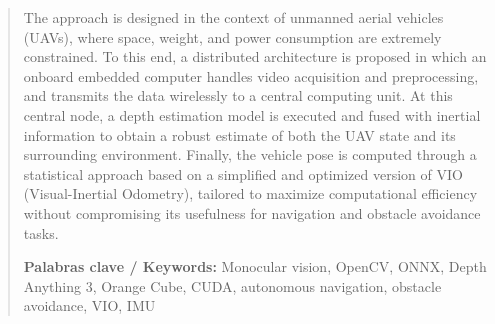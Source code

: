 \begin{abstract}
	The approach is designed in the context of unmanned aerial vehicles (UAVs), where space, weight, and power consumption are extremely 
	constrained. To this end, a distributed architecture is proposed in which an onboard embedded computer handles video acquisition and 
	preprocessing, and transmits the data wirelessly to a central computing unit. At this central node, a depth estimation model is 
	executed and fused with inertial information to obtain a robust estimate of both the UAV state and its surrounding environment. 
	Finally, the vehicle pose is computed through a statistical approach based on a simplified and optimized version of VIO 
	(Visual-Inertial Odometry), tailored to maximize computational efficiency without compromising its 
	usefulness for navigation and obstacle avoidance tasks.

	\textbf{Palabras clave / Keywords:}
	Monocular vision, OpenCV, ONNX, Depth Anything 3, Orange Cube, CUDA, autonomous navigation, obstacle avoidance, VIO, IMU
	
	\vfill
\end{abstract}

	\newpage %
	\thispagestyle{empty}
	\mbox{}



\setcounter{page}{5}
	
		
	\vfill
	
	\newpage %
	\thispagestyle{empty}
	\mbox{}
	


\tableofcontents
\thispagestyle{fancy}

\newpage %
\thispagestyle{empty}
\mbox{}

\listoffigures
\thispagestyle{fancy}

\newpage %
\thispagestyle{empty}
\mbox{}

\listoftables
\thispagestyle{fancy}

\newpage %
\thispagestyle{empty}
\mbox{}
